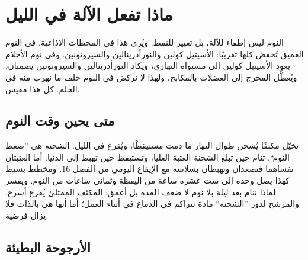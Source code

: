 \chapter{ماذا تفعل الآلة في الليل}

النوم ليس إطفاء للآلة، بل تغيير للنمط. ويُرى هذا في المحطات الإذاعية. في النوم العميق تُخفض كلها تقريبًا: الأسيتيل كولين والنورأدرينالين والسيروتونين. وفي نوم الأحلام يعود الأسيتيل كولين إلى مستواه النهاري، ويكاد النورأدرينالين والسيروتونين يصمتان، ويُعطَّل المخرج إلى العضلات بالمكابح، ولهذا لا نركض في النوم خلف ما نهرب منه في الحلم. كل هذا مقيس.

\section*{متى يحين وقت النوم}

تخيّل مكثفًا يُشحن طوال النهار ما دمت مستيقظًا، ويُفرغ في الليل. الشحنة هي ”ضغط النوم“. تنام حين تبلغ الشحنة العتبة العليا، وتستيقظ حين تهبط إلى الدنيا. أما العتبتان نفساهما فتصعدان وتهبطان بسلاسة مع الإيقاع اليومي من الفصل 16. ومخطط بسيط كهذا يصل وحده إلى ست عشرة ساعة من اليقظة وثماني ساعات من النوم. ويفسر لماذا ننام بعد ليلة بلا نوم لا ضعف المدة بل أعمق: المكثف الممتلئ يُفرغ أسرع. والمرشح لدور ”الشحنة“ مادة تتراكم في الدماغ في أثناء العمل؛ أما أنها هي بالذات فلا يزال فرضية.


\section*{الأرجوحة البطيئة}

